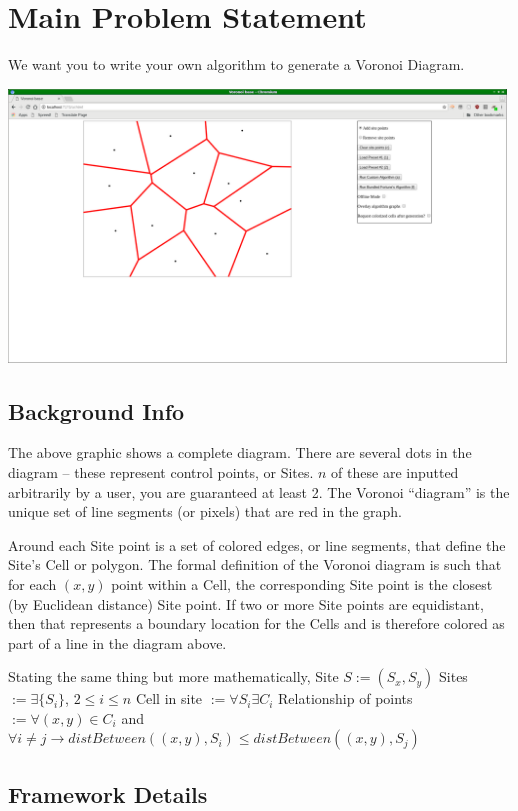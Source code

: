 \documentclass[12pt]{article}
\newcommand{\nl}{\newline}
\begin{document}
\section*{Main Problem Statement}

We want you to write your own algorithm to generate a Voronoi Diagram. \nl

\includegraphics[width=0.99\textwidth]{screenshot_nocolor.png}

\subsection*{Background Info}

The above graphic shows a complete diagram. There are several dots in the
diagram -- these represent control points, or Sites. $n$ of these are inputted
arbitrarily by a user, you are guaranteed at least 2. The Voronoi ``diagram''
is the unique set of line segments (or pixels) that are red in the graph.

Around each Site point is a set of colored edges, or line segments, that define the Site's
Cell or polygon. The formal definition of the Voronoi diagram is such that for each
$(x, y)$ point within a Cell, the corresponding Site point is the closest (by
Euclidean distance) Site point. If two or more Site points are equidistant,
then that represents a boundary location for the Cells and is therefore
colored as part of a line in the diagram above.

Stating the same thing but more mathematically,\nl\nl
Site $S := (S_x, S_y)$ \nl
Sites $:= \exists \{S_i\}$, $2 \leq i \leq n$ \nl
Cell in site $:= \forall S_i \exists C_i$ \nl
Relationship of points $:= \forall (x,y) \in C_i$ and $\forall i \neq j
\rightarrow distBetween((x,y), S_i) \leq distBetween((x,y), S_j)$

\subsection*{Framework Details}
\end{document}
